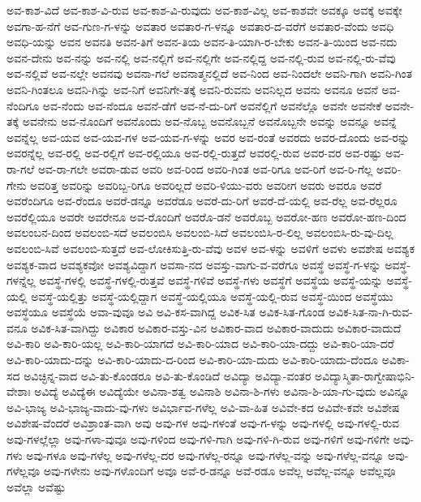 {ಅವ-ಕಾಶ-ವಿದೆ
ಅವ-ಕಾಶ-ವಿ-ರುವ
ಅವ-ಕಾಶ-ವಿ-ರುವುದು
ಅವ-ಕಾಶ-ವಿಲ್ಲ
ಅವ-ಕಾಶವೇ
ಅವಕ್ಕೂ
ಅವಕ್ಕೆ
ಅವಕ್ಕೇ
ಅವಗಾ-ಹ-ನೆಗೆ
ಅವ-ಗುಣ-ಗ-ಳನ್ನು
ಅವತಾರ
ಅವತಾರ-ಗ-ಳನ್ನೂ
ಅವತಾರ-ದ-ವರೆಗೆ
ಅವತಾರ-ವೆಂದು
ಅವಧಿ
ಅವಧಿ-ಯನ್ನು
ಅವನ
ಅವನತಿ
ಅವನ-ತಿಗೆ
ಅವನ-ತಿಯ
ಅವನ-ತಿ-ಯಾಗಿ-ರ-ಬೇಕು
ಅವನ-ತಿ-ಯಿಂದ
ಅವ-ನದು
ಅವನ-ದೇನು
ಅವ-ನನ್ನು
ಅವ-ನಲ್ಲಿ
ಅವ-ನಲ್ಲಿಗೆ
ಅವ-ನಲ್ಲಿಗೇ
ಅವ-ನಲ್ಲಿದ್ದ
ಅವ-ನಲ್ಲಿ-ರುವ
ಅವ-ನಲ್ಲಿ-ರು-ವೆವು
ಅವ-ನಲ್ಲಿವೆ
ಅವ-ನಲ್ಲೇ
ಅವನವು
ಅವನಾ-ಗಲೆ
ಅವನಾತ್ಮನಲ್ಲಿದೆ
ಅವ-ನಿಂದ
ಅವ-ನಿಂದಲೇ
ಅವನಿ-ಗಾಗಿ
ಅವನಿ-ಗಿಂತ
ಅವನಿ-ಗಿಂತಲೂ
ಅವನಿ-ಗಿನ್ನು
ಅವ-ನಿಗೆ
ಅವನಿಗೇ-ತಕ್ಕೆ
ಅವನಿ-ರುವನು
ಅವನಿಲ್ಲದ
ಅವನು
ಅವನೂ
ಅವನೆ
ಅವ-ನೆಂದಿಗೂ
ಅವ-ನೆಂದು
ಅವ-ನೆಂದೂ
ಅವನೆ-ಡೆಗೆ
ಅವ-ನೆ-ದು-ರಿಗೆ
ಅವನೆಲ್ಲಿಗೆ
ಅವನೆಲ್ಲೊ
ಅವನೇ
ಅವನೇಕೆ
ಅವನೇ-ತಕ್ಕೆ
ಅವನೇನು
ಅವ-ನೊಂದಿಗೆ
ಅವನೊಂದು
ಅವ-ನೊಬ್ಬ
ಅವನೊಬ್ಬನೆ
ಅವನೊಬ್ಬನೇ
ಅವನ್ನು
ಅವನ್ನೂ
ಅವನ್ನೆ
ಅವನ್ನೆಲ್ಲ
ಅವ-ಯವ
ಅವ-ಯವ-ಗಳ
ಅವ-ಯವ-ಗ-ಳನ್ನು
ಅವರ
ಅವ-ರಂತೆ
ಅವರದು
ಅವರ-ದೊಂದು
ಅವ-ರನ್ನು
ಅವರನ್ನೆಲ್ಲ
ಅವ-ರಲ್ಲಿ
ಅವ-ರಲ್ಲಿಗೆ
ಅವ-ರಲ್ಲಿಯೂ
ಅವ-ರಲ್ಲಿ-ರುತ್ತದೆ
ಅವರಲ್ಲಿ-ರುವ
ಅವರ-ವರ
ಅವ-ರಷ್ಟು
ಅವ-ರಾ-ಗಲೆ
ಅವ-ರಾ-ಗಲೇ
ಅವರಾ-ಡುವ
ಅವರಿ
ಅವ-ರಿಂದ
ಅವರಿ-ಗಿಂತ
ಅವ-ರಿಗೂ
ಅವ-ರಿಗೆ
ಅವ-ರಿ-ಗೆಲ್ಲ
ಅವರಿ-ಗೇನು
ಅವರಿತ್ತ
ಅವರಿನ್ನು
ಅವರಿಬ್ಬ-ರಿಗೂ
ಅವರಿಲ್ಲದೆ
ಅವರಿ-ಳಿಯು-ವರು
ಅವರೀಗ
ಅವರು
ಅವರೂ
ಅವರೆ
ಅವರೆಂದಿಗೂ
ಅವ-ರೆಂದೂ
ಅವರೆ-ಡನ್ನೂ
ಅವರೆಡೂ
ಅವರೆ-ದು-ರಿಗೆ
ಅವರೆ-ದೆ-ಯಲ್ಲಿ
ಅವ-ರೆಲ್ಲ
ಅವ-ರೆಲ್ಲರೂ
ಅವರೆಲ್ಲಿಯೂ
ಅವರೇ
ಅವರೇನೂ
ಅವ-ರೊಂದಿಗೆ
ಅವರೊ-ಡನೆ
ಅವರೊಬ್ಬ
ಅವರೋ-ಹಣ
ಅವರೋ-ಹಣ-ದಿಂದ
ಅವಲಂಬನ-ದಿಂದ
ಅವಲಂಬಿ-ಸದೆ
ಅವಲಂಬಿಸಿ
ಅವಲಂಬಿ-ಸಿದೆ
ಅವಲಂಬಿಸಿ-ರ-ಲಿಲ್ಲ
ಅವಲಂಬಿಸಿ-ರು-ವು-ದಿಲ್ಲ
ಅವಲಂಬಿ-ಸಿವೆ
ಅವಲಂಬಿ-ಸುತ್ತದೆ
ಅವ-ಲೋಕಿಸುತ್ತಿ-ರು-ವೆವು
ಅವಳ
ಅವ-ಳನ್ನು
ಅವಳಿಗೆ
ಅವಳು
ಅವಶೇಷ
ಅವಶ್ಯಕ
ಅವಶ್ಯಕ-ವಾದ
ಅವಶ್ಯಕವೋ
ಅವಶ್ಯವಿದ್ದಾಗ
ಅವಸಾ-ನದ
ಅವಸ್ತು-ವಾಗು-ವ-ವರೆಗೂ
ಅವಸ್ಥೆ
ಅವಸ್ಥೆ-ಗ-ಳನ್ನು
ಅವಸ್ಥೆ-ಗಳನ್ನೆಲ್ಲ
ಅವಸ್ಥೆ-ಗಳಲ್ಲಿ
ಅವಸ್ಥೆ-ಗಳಲ್ಲಿ-ರುತ್ತವೆ
ಅವಸ್ಥೆ-ಗಳಿವೆ
ಅವಸ್ಥೆ-ಗಳು
ಅವಸ್ಥೆಗೆ
ಅವಸ್ಥೆಯ
ಅವಸ್ಥೆ-ಯನ್ನು
ಅವಸ್ಥೆ-ಯಲ್ಲಿ
ಅವಸ್ಥೆ-ಯಲ್ಲಿತ್ತು
ಅವಸ್ಥೆ-ಯಲ್ಲಿದ್ದಾಗ
ಅವಸ್ಥೆ-ಯಲ್ಲಿಯೂ
ಅವಸ್ಥೆ-ಯಲ್ಲಿ-ರುವ
ಅವಸ್ಥೆ-ಯಿಂದ
ಅವಸ್ಥೆಯು
ಅವಸ್ಥೆಯೂ
ಅವಸ್ಥೆಯೆ
ಅವಾ-ವುವೂ
ಅವಿ
ಅವಿ-ಕಸ-ವಾಗಿದ್ದ
ಅವಿಕ-ಸಿತ
ಅವಿಕ-ಸಿತ-ಗೊಂಡ
ಅವಿಕ-ಸಿತ-ನಾ-ಗಿ-ರುವ-ವನೂ
ಅವಿಕ-ಸಿತ-ವಾಗಿದ್ದು
ಅವಿಕಾರ
ಅವಿಕಾರ-ವಸ್ತು-ವಿನ
ಅವಿಕಾರ-ವಾದ
ಅವಿಕಾರ-ವಾದುದು
ಅವಿಕಾರ-ವಾದುದೆ
ಅವಿ-ಕಾರಿ
ಅವಿ-ಕಾರಿ-ಯಲ್ಲ
ಅವಿ-ಕಾರಿ-ಯಾಗದೆ
ಅವಿ-ಕಾರಿ-ಯಾದ
ಅವಿ-ಕಾರಿ-ಯಾ-ದದ್ದು
ಅವಿ-ಕಾರಿ-ಯಾ-ದರೆ
ಅವಿ-ಕಾರಿ-ಯಾದು-ದನ್ನು
ಅವಿ-ಕಾರಿ-ಯಾದು-ದ-ರಿಂದ
ಅವಿ-ಕಾರಿ-ಯಾ-ದುದು
ಅವಿ-ಕಾರಿ-ಯಾದು-ದೆಂದೂ
ಅವಿಕಾ-ಸದ
ಅವಿಚ್ಛಿನ್ನ-ವಾದ
ಅವಿ-ತು-ಕೊಂಡರೂ
ಅವಿ-ತು-ಕೊಂಡಿದೆ
ಅವಿದ್ಯಾ
ಅವಿದ್ಯಾ-ವಂತರ
ಅವಿದ್ಯಾಸ್ಮಿತಾ-ರಾಗ್ವೇಷಾಭಿನಿ-ವೇಶಾಃ
ಅವಿದ್ಯೆ
ಅವಿದ್ಯೆಈ
ಅವಿದ್ಯೆಯೇ
ಅವಿನಾ-ಶತ್ವ
ಅವಿನಾಶಿ
ಅವಿನಾ-ಶಿ-ಗಳು
ಅವಿನಾ-ಶಿ-ಯಾ-ಗು-ವುದು
ಅವಿನ್ನೂ
ಅವಿ-ಭಾಜ್ಯ
ಅವಿ-ಭಾಜ್ಯ-ವಾದು-ವು-ಗಳು
ಅವಿರ್ಭಾವ-ಗಳೆಲ್ಲ
ಅವಿ-ವಾ-ಹಿತ
ಅವಿವೇ-ಕದ
ಅವಿವೇ-ಕವೇ
ಅವಿಶೇಷ
ಅವಿಶೇಷ-ವೆಂದರೆ
ಅವಿಶ್ರಾಂತ-ವಾಗಿ
ಅವು
ಅವು-ಗಳ
ಅವು-ಗಳಂತೆ
ಅವು-ಗ-ಳನ್ನು
ಅವು-ಗಳಲ್ಲಿ
ಅವು-ಗಳಲ್ಲಿ-ರುವ
ಅವು-ಗಳಲ್ಲೆಲ್ಲಾ
ಅವು-ಗಳಾ-ವುವೂ
ಅವು-ಗಳಿಂದ
ಅವು-ಗಳಿ-ಗಾಗಿ
ಅವು-ಗಳಿ-ಗಿ-ರುವ
ಅವು-ಗಳಿಗೆ
ಅವು-ಗಳಿಗೇ
ಅವು-ಗಳು
ಅವು-ಗಳೂ
ಅವು-ಗಳೆಲ್ಲ
ಅವು-ಗಳೆಲ್ಲ-ದರ
ಅವು-ಗಳೆಲ್ಲ-ರನ್ನೂ
ಅವು-ಗಳೆಲ್ಲ-ವನ್ನು
ಅವು-ಗಳೆಲ್ಲ-ವನ್ನೂ
ಅವು-ಗಳೆಲ್ಲವೂ
ಅವು-ಗಳೇನು
ಅವು-ಗಳೊಂದಿಗೆ
ಅವೂ
ಅವೆ-ರ-ಡನ್ನೂ
ಅವೆ-ರಡೂ
ಅವೆಲ್ಲ
ಅವೆಲ್ಲ-ವನ್ನೂ
ಅವೆಲ್ಲವೂ
ಅವೆಲ್ಲಾ
ಅವೆಷ್ಟು
}
